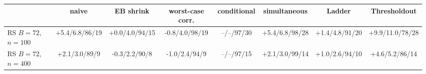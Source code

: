 \begin{tabular}{lccccccc}
\toprule
 & naive & EB shrink & worst-case corr. & conditional & simultaneous & Ladder & Thresholdout \\
\midrule
RS $B{=}72$, $n{=}100$ & +5.4/6.8/86/19 & +0.0/4.0/94/15 & -0.8/4.0/98/19 & --/--/97/30 & +5.4/6.8/98/28 & +1.4/4.8/91/20 & +9.9/11.0/78/28 \\
RS $B{=}72$, $n{=}400$ & +2.1/3.0/89/9 & -0.3/2.2/90/8 & -1.0/2.4/94/9 & --/--/97/15 & +2.1/3.0/99/14 & +1.0/2.6/94/10 & +4.6/5.2/86/14 \\
\bottomrule
\end{tabular}
